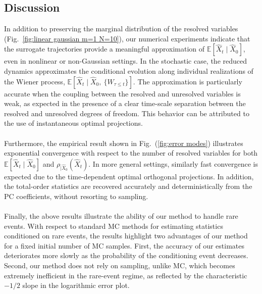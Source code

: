 \documentclass[11pt, a4paper, oneside, reqno]{amsart}
\begin{document}
\subsection{Discussion}
\noindent In addition to preserving the marginal distribution of the resolved variables (Fig.~\ref{fig:linear gaussian m=1 N=10}), our numerical experiments indicate that the surrogate trajectories provide a meaningful approximation of $\mathbb{E}[\hat{X}_t\mid\hat{X}_0]$, even in nonlinear or non-Gaussian settings.
In the stochastic case, the reduced dynamics approximates the conditional evolution along individual realizations of the Wiener process, $\mathbb{E}[\hat{X}_t\mid\hat{X}_0, \ \{W_{\tau\leq t}\}]$.
The approximation is particularly accurate when the coupling between the resolved and unresolved variables is weak, as expected in the presence of a clear time-scale separation between the resolved and unresolved degrees of freedom. This behavior can be attributed to the use of instantaneous optimal projections.\\ \ \\
Furthermore, the empirical result shown in Fig.~(\ref{fig:error modes}) illustrates exponential convergence  with respect to the number of resolved variables for both $\mathbb{E}[\hat{X}_t\mid\hat{X}_0]$ and $\rho_{|\hat{X}_0}(\hat{X}_t)$. In more general settings, similarly fast convergence is expected due to the time-dependent optimal orthogonal projections. In addition, the total-order statistics are recovered accurately and deterministically from the PC coefficients, without resorting to sampling. \\ \ \\
Finally, the above results illustrate the ability of our method to handle rare events. With respect to standard MC methods for estimating statistics conditioned on rare events, the results highlight two advantages of our method for a fixed initial number of MC samples.%
First, the accuracy of our estimates deteriorates more slowly as the probability of the conditioning event decreases. Second, our method does not rely on sampling, unlike MC, which becomes extremely inefficient in the rare-event regime, as reflected by the characteristic $-1/2$ slope in the logarithmic error plot. %
\end{document}
